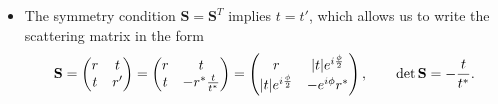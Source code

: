 \documentclass[11pt, a4paper]{article}
\newcommand{\mat}[1]{\mathbf{#1}}  %
\renewcommand{\SS}{\mat{S}}  %
\begin{document}
\begin{itemize}
    \item The symmetry condition $ \SS = \SS^{T} $ implies $ t = t' $, which allows us to write the scattering matrix in the form
    \begin{equation*}
        \SS = 
        \begin{pmatrix}
            r & t\\
            t & r'
        \end{pmatrix}
        = 
        \begin{pmatrix}
            r & t\\
            t & - r^{*}\frac{t}{t^{*}}
        \end{pmatrix}
        = 
        \begin{pmatrix}
            r & \abs{t}e^{i\frac{\phi}{2}}\\
            \abs{t}e^{i\frac{\phi}{2}} & - e^{i\phi}r^{*}
        \end{pmatrix}, \qquad \det \SS = - \frac{t}{t^{*}}.
    \end{equation*}

\end{itemize}
\end{document}
